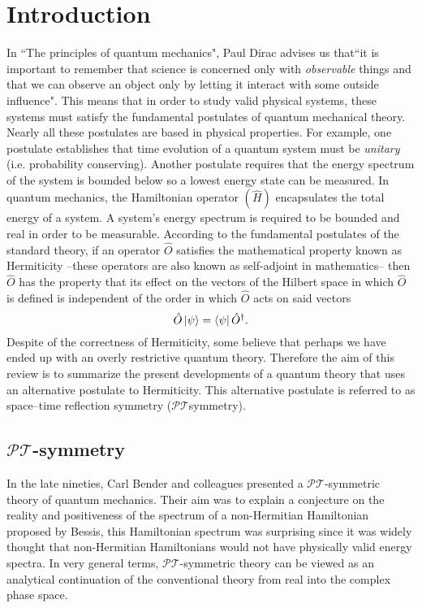 \documentclass[12pt, a4paper]{report}
\newcommand\PT{\(\mathcal{PT}\)}
\begin{document}
\tableofcontents %

\chapter{Introduction}\label{Introduction}
In ``The principles of quantum mechanics", Paul Dirac advises us that``it is important to remember that science is concerned only with \textit{observable} things and that we can observe an object only by letting it interact with some outside influence"\cite{POQM}. This means that in order to study valid physical systems, these systems must satisfy the fundamental postulates of quantum mechanical theory. Nearly all these postulates are based in physical properties. For example, one postulate establishes that time evolution of a quantum system must be \textit{unitary} (i.e. probability conserving). Another postulate requires that the energy spectrum of the system is bounded below so a lowest energy state can be measured. In quantum mechanics, the Hamiltonian operator $(\hat{H})$ encapsulates the total energy of a system. A system's energy spectrum is required to be bounded and real in order to be measurable. According to the fundamental postulates of the standard theory, if an operator $\hat{O}$ satisfies the mathematical property known as Hermiticity --these operators are also known as self-adjoint in mathematics-- then $\hat{O}$  has the property that its effect on the vectors of the Hilbert space in which $\hat{O}$ is defined is independent of the order in which $\hat{O}$ acts on said vectors\cite{Jones-Smith}
\begin{equation}\label{eq:1.1}
\hat{O}\ket{\psi} = \bra{\psi}\hat{O}^{\dagger}.
\end{equation}
Despite of the correctness of Hermiticity, some believe that perhaps we have ended up with an overly restrictive quantum theory. Therefore the aim of this review is to summarize the present developments of a quantum theory that uses an alternative postulate to Hermiticity. This alternative postulate is referred to as space–time reflection symmetry (\PT\:symmetry)\cite{MustaHbeHermitian}. 

\section{\texorpdfstring{$\mathcal{PT}$}\:-symmetry}\label{PT}
In the late nineties, Carl Bender and colleagues presented a \PT-symmetric theory of quantum mechanics. Their aim was to explain a conjecture on the reality and positiveness of the spectrum of a non-Hermitian Hamiltonian proposed by Bessis\cite{Bender1998}, this Hamiltonian spectrum was surprising since it was widely thought that non-Hermitian Hamiltonians would not have physically valid energy spectra. In very general terms, \PT-symmetric theory can be viewed as an analytical continuation of the conventional theory from real into the complex phase space\cite{PTsymmetricQM}.
\end{document}
